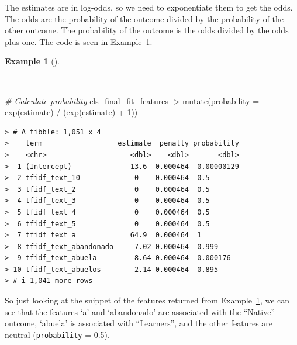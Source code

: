 \documentclass[
  letterpaper,
]{latex/krantz}
\newenvironment{Shaded}{\begin{snugshade}}{\end{snugshade}}
\newcommand{\AttributeTok}[1]{\textcolor[rgb]{0.00,0.00,0.00}{#1}}
\newcommand{\CommentTok}[1]{\textcolor[rgb]{0.00,0.00,0.00}{\textit{#1}}}
\newcommand{\DecValTok}[1]{\textcolor[rgb]{0.00,0.00,0.00}{#1}}
\newcommand{\FunctionTok}[1]{\textcolor[rgb]{0.00,0.00,0.00}{#1}}
\newcommand{\NormalTok}[1]{\textcolor[rgb]{0.00,0.00,0.00}{#1}}
\newcommand{\SpecialCharTok}[1]{\textcolor[rgb]{0.00,0.00,0.00}{#1}}
\theoremstyle{definition}
\newtheorem{example}{Example}[chapter]
\theoremstyle{remark}
\begin{document}
The estimates are in log-odds, so we need to exponentiate them to get
the odds. The odds are the probability of the outcome divided by the
probability of the other outcome. The probability of the outcome is the
odds divided by the odds plus one. The code is seen in
Example~\ref{exm-pda-class-tune-hyperparameters-evaluate-test-estimates-probability}.

\begin{example}[]\protect\hypertarget{exm-pda-class-tune-hyperparameters-evaluate-test-estimates-probability}{}\label{exm-pda-class-tune-hyperparameters-evaluate-test-estimates-probability}

~

\begin{Shaded}
\begin{Highlighting}[]
\CommentTok{\# Calculate probability}
\NormalTok{cls\_final\_fit\_features }\SpecialCharTok{|\textgreater{}}
  \FunctionTok{mutate}\NormalTok{(}\AttributeTok{probability =} \FunctionTok{exp}\NormalTok{(estimate) }\SpecialCharTok{/}\NormalTok{ (}\FunctionTok{exp}\NormalTok{(estimate) }\SpecialCharTok{+} \DecValTok{1}\NormalTok{))}
\end{Highlighting}
\end{Shaded}

\begin{verbatim}
> # A tibble: 1,051 x 4
>    term                  estimate  penalty probability
>    <chr>                    <dbl>    <dbl>       <dbl>
>  1 (Intercept)             -13.6  0.000464  0.00000129
>  2 tfidf_text_10             0    0.000464  0.5       
>  3 tfidf_text_2              0    0.000464  0.5       
>  4 tfidf_text_3              0    0.000464  0.5       
>  5 tfidf_text_4              0    0.000464  0.5       
>  6 tfidf_text_5              0    0.000464  0.5       
>  7 tfidf_text_a             64.9  0.000464  1         
>  8 tfidf_text_abandonado     7.02 0.000464  0.999     
>  9 tfidf_text_abuela        -8.64 0.000464  0.000176  
> 10 tfidf_text_abuelos        2.14 0.000464  0.895     
> # i 1,041 more rows
\end{verbatim}

\end{example}

So just looking at the snippet of the features returned from
Example~\ref{exm-pda-class-tune-hyperparameters-evaluate-test-estimates-probability},
we can see that the features `a' and `abandonado' are associated with
the ``Native'' outcome, `abuela' is associated with ``Learners'', and
the other features are neutral (\texttt{probability} = 0.5).
\end{document}
